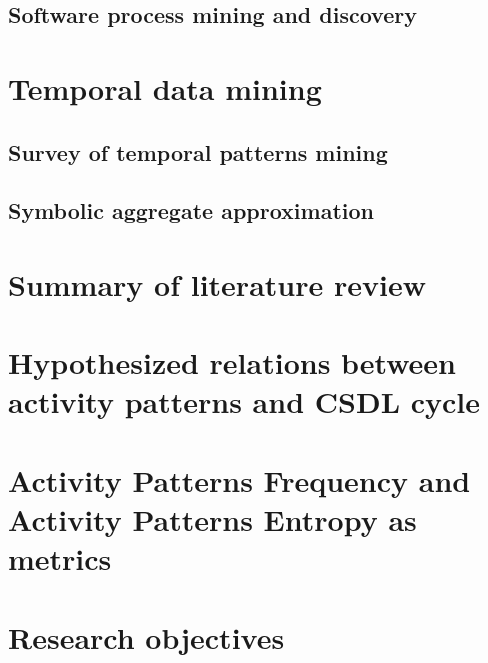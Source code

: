 \subsection{Software process mining and discovery}\label{mackground.bpm}


\section{Temporal data mining}
\subsection{Survey of temporal patterns mining}
\subsection{Symbolic aggregate approximation}

\section{Summary of literature review}

\section{Hypothesized relations between activity patterns and CSDL cycle}

\section{Activity Patterns Frequency and Activity Patterns Entropy as metrics}

\section{Research objectives}